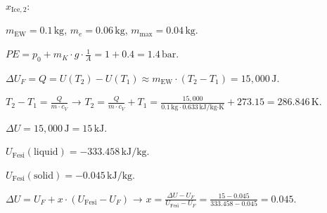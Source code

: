 \( x_{\text{Ice},2} \):  

\( m_{\text{EW}} = 0.1 \, \text{kg} \), \( m_e = 0.06 \, \text{kg} \), \( m_{\text{max}} = 0.04 \, \text{kg} \).  

\( PE = p_0 + m_K \cdot g \cdot \frac{1}{A} = 1 + 0.4 = 1.4 \, \text{bar} \).  

\( \Delta U_F = Q = U(T_2) - U(T_1) \approx m_{\text{EW}} \cdot (T_2 - T_1) = 15,000 \, \text{J} \).  

\( T_2 - T_1 = \frac{Q}{m \cdot c_V} \) → \( T_2 = \frac{Q}{m \cdot c_V} + T_1 = \frac{15,000}{0.1 \, \text{kg} \cdot 0.633 \, \text{kJ/kg·K}} + 273.15 = 286.846 \, \text{K} \).  

\( \Delta U = 15,000 \, \text{J} = 15 \, \text{kJ} \).  

\( U_{\text{Fesi}} (\text{liquid}) = -333.458 \, \text{kJ/kg} \).  

\( U_{\text{Fesi}} (\text{solid}) = -0.045 \, \text{kJ/kg} \).  

\( \Delta U = U_F + x \cdot (U_{\text{Fesi}} - U_F) \) → \( x = \frac{\Delta U - U_F}{U_{\text{Fesi}} - U_F} = \frac{15 - 0.045}{333.458 - 0.045} = 0.045 \).